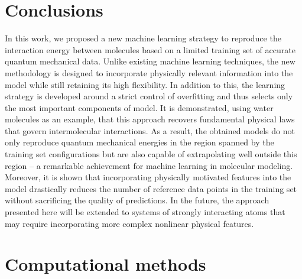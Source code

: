 \documentclass[aip,jcp,reprint,amsmath,amssymb,nature]{revtex4-1}
\begin{document}
\section{Conclusions}

In this work, we proposed a new machine learning strategy to reproduce the interaction energy between molecules based on a limited training set of accurate quantum mechanical data. Unlike existing machine learning techniques, the new methodology is designed to incorporate physically relevant information into the model while still retaining its high flexibility. In addition to this, the learning strategy is developed around a strict control of overfitting and thus selects only the most important components of model. 
It is demonstrated, using water molecules as an example, that this approach recovers fundamental physical laws that govern intermolecular interactions. As a result, the obtained models do not only reproduce quantum mechanical energies in the region spanned by the training set configurations but are also capable of extrapolating well outside this region -- a remarkable achievement for machine learning in molecular modeling. Moreover, it is shown that incorporating physically motivated features into the model drastically reduces the number of reference data points in the training set without sacrificing the quality of predictions. 
In the future, the approach presented here will be extended to systems of strongly interacting atoms 
that may require incorporating more complex nonlinear physical features. 


\section{Computational methods}
\end{document}
